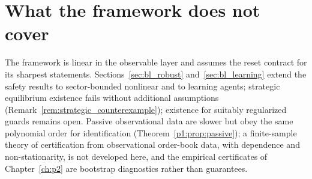 \section{What the framework does not cover}\label{sec:fw_scope}

The framework is linear in the observable layer and assumes the reset contract for its sharpest statements. Sections~\ref{sec:bl_robust} and~\ref{sec:bl_learning} extend the safety results to sector-bounded nonlinear and to learning agents; strategic equilibrium existence fails without additional assumptions (Remark~\ref{rem:strategic_counterexample}); existence for suitably regularized guards remains open. Passive observational data are slower but obey the same polynomial order for identification (Theorem~\ref{p1:prop:passive}); a finite-sample theory of certification from observational order-book data, with dependence and non-stationarity, is not developed here, and the empirical certificates of Chapter~\ref{ch:p2} are bootstrap diagnostics rather than guarantees.
